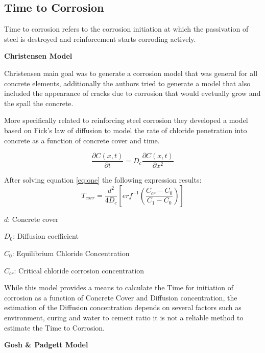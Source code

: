  
\subsection{Time to Corrosion}

Time to corrosion refers to the corrosion initiation at which the passivation of steel is destroyed and reinforcement starts corroding actively.
\newline

\textbf{Christensen Model}
\newline

Christensen \cite{Thoft-Christensen} main goal was to generate a corrosion model that was general for all concrete elements, additionally the authors tried to generate a model that also included the appearance of cracks due to corrosion that would evetually grow and the spall the concrete. 

More specifically related to reinforcing steel corrosion they developed a model based on Fick's law of diffusion to model the rate of chloride penetration into concrete as a function of concrete cover and time. 

\begin{equation}
	\frac{\partial C(x,t)}{\partial t} = D_c \frac{\partial C(x,t)}{\partial x^2}
	\label{eq:one}
\end{equation}

After solving equation \ref{eq:one} the following expression results:
\begin{equation}
  T_{corr}=\frac{d^2}{4D_c} \left[erf^{-1}\left(\frac{C_{cr}-C_{0}}{C_1 -C_0}\right)\right]
  \label{eq:two}
\end{equation} 

$d$: Concrete cover

$D_0$: Diffusion coefficient

$C_{0}$: Equilibrium Chloride Concentration

$C_{cr}$: Critical chloride corrosion concentration
\newline

While this model provides a means to calculate the Time for initiation of corrosion as a function of Concrete Cover and Diffusion concentration, the estimation of the Diffusion concentration depends on several factors such as environment, curing and water to cement ratio it is not a reliable method to estimate the Time to Corrosion.
\newline

\textbf{Gosh \& Padgett Model}
\newline

